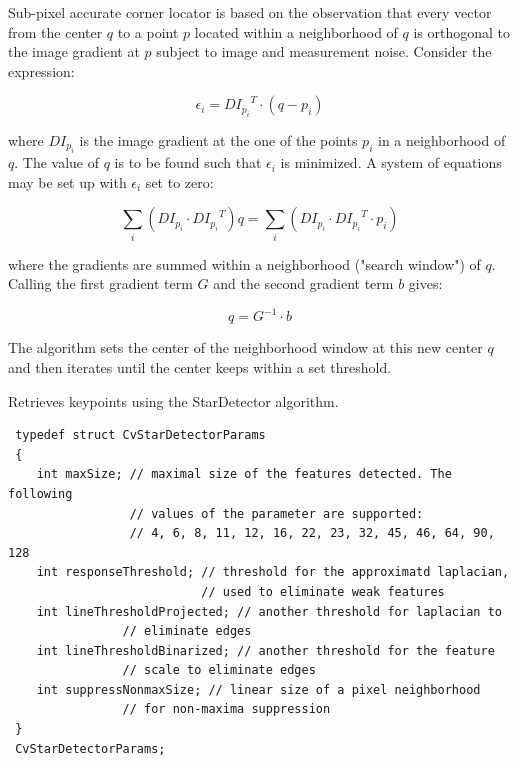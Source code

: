 Sub-pixel accurate corner locator is based on the observation that every vector from the center $q$ to a point $p$ located within a neighborhood of $q$ is orthogonal to the image gradient at $p$ subject to image and measurement noise. Consider the expression:

\[
\epsilon_i = {DI_{p_i}}^T \cdot (q - p_i)
\]

where ${DI_{p_i}}$ is the image gradient at the one of the points $p_i$ in a neighborhood of $q$. The value of $q$ is to be found such that $\epsilon_i$ is minimized. A system of equations may be set up with $\epsilon_i$ set to zero:

\[
\sum_i(DI_{p_i} \cdot {DI_{p_i}}^T) q = \sum_i(DI_{p_i} \cdot {DI_{p_i}}^T \cdot p_i)
\]

where the gradients are summed within a neighborhood ("search window") of $q$. Calling the first gradient term $G$ and the second gradient term $b$ gives:

\[
q = G^{-1} \cdot b
\]

The algorithm sets the center of the neighborhood window at this new center $q$ and then iterates until the center keeps within a set threshold.

Retrieves keypoints using the StarDetector algorithm.


\begin{description}
\begin{lstlisting}
 typedef struct CvStarDetectorParams
 {
    int maxSize; // maximal size of the features detected. The following 
                 // values of the parameter are supported:
                 // 4, 6, 8, 11, 12, 16, 22, 23, 32, 45, 46, 64, 90, 128
    int responseThreshold; // threshold for the approximatd laplacian,
                           // used to eliminate weak features
    int lineThresholdProjected; // another threshold for laplacian to 
                // eliminate edges
    int lineThresholdBinarized; // another threshold for the feature 
                // scale to eliminate edges
    int suppressNonmaxSize; // linear size of a pixel neighborhood 
                // for non-maxima suppression
 }
 CvStarDetectorParams;
\end{lstlisting}
\end{description}

